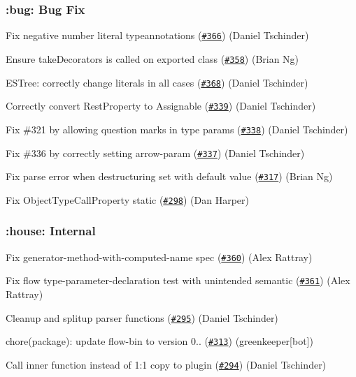 \subsubsection*{\+:bug\+: Bug Fix}

Fix negative number literal typeannotations (\href{https://github.com/babel/babylon/pull/366}{\tt \#366}) (Daniel Tschinder)

Ensure take\+Decorators is called on exported class (\href{https://github.com/babel/babylon/pull/358}{\tt \#358}) (Brian Ng)

E\+S\+Tree\+: correctly change literals in all cases (\href{https://github.com/babel/babylon/pull/368}{\tt \#368}) (Daniel Tschinder)

Correctly convert Rest\+Property to Assignable (\href{https://github.com/babel/babylon/pull/339}{\tt \#339}) (Daniel Tschinder)

Fix \#321 by allowing question marks in type params (\href{https://github.com/babel/babylon/pull/338}{\tt \#338}) (Daniel Tschinder)

Fix \#336 by correctly setting arrow-\/param (\href{https://github.com/babel/babylon/pull/337}{\tt \#337}) (Daniel Tschinder)

Fix parse error when destructuring {\ttfamily set} with default value (\href{https://github.com/babel/babylon/pull/317}{\tt \#317}) (Brian Ng)

Fix Object\+Type\+Call\+Property static (\href{https://github.com/babel/babylon/pull/298}{\tt \#298}) (Dan Harper)

\subsubsection*{\+:house\+: Internal}

Fix generator-\/method-\/with-\/computed-\/name spec (\href{https://github.com/babel/babylon/pull/360}{\tt \#360}) (Alex Rattray)

Fix flow type-\/parameter-\/declaration test with unintended semantic (\href{https://github.com/babel/babylon/pull/361}{\tt \#361}) (Alex Rattray)

Cleanup and splitup parser functions (\href{https://github.com/babel/babylon/pull/295}{\tt \#295}) (Daniel Tschinder)

chore(package)\+: update flow-\/bin to version 0.. (\href{https://github.com/babel/babylon/pull/313}{\tt \#313}) (greenkeeper\mbox{[}bot\mbox{]})

Call inner function instead of 1\+:1 copy to plugin (\href{https://github.com/babel/babylon/pull/294}{\tt \#294}) (Daniel Tschinder)


